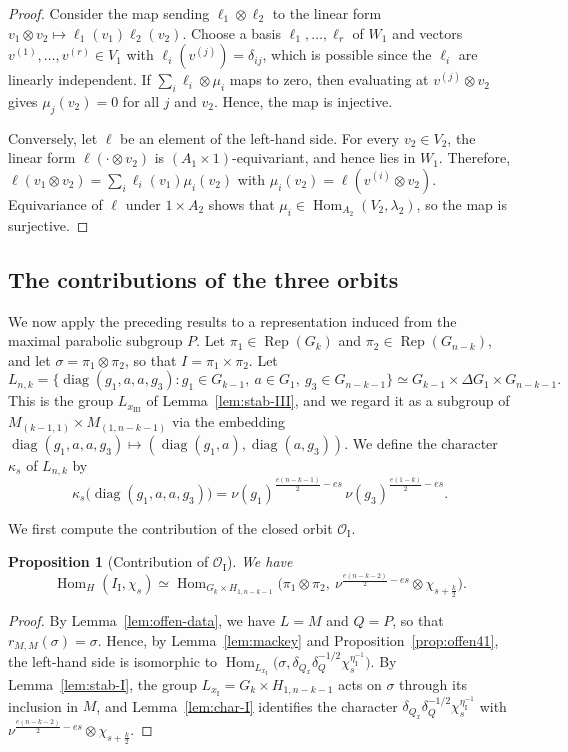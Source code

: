\documentclass[11pt]{amsart}
\numberwithin{equation}{section}
\theoremstyle{plain}
\newtheorem{proposition}[theorem]{Proposition}
\theoremstyle{definition}
\theoremstyle{remark}
\DeclareMathOperator{\Hom}{Hom}
\DeclareMathOperator{\Rep}{Rep}
\DeclareMathOperator{\diag}{diag}
\newcommand{\OI}{\mathcal{O}_{\mathrm{I}}}
\begin{document}
\begin{proof}
	Consider the map sending $\ell_1\otimes\ell_2$ to the linear form $v_1\otimes v_2\mapsto\ell_1(v_1)\ell_2(v_2)$. Choose a basis $\ell_1,\dots,\ell_r$ of $W_1$ and vectors $v^{(1)},\dots,v^{(r)}\in V_1$ with $\ell_i(v^{(j)})=\delta_{ij}$, which is possible since the $\ell_i$ are linearly independent. If $\sum_i\ell_i\otimes\mu_i$ maps to zero, then evaluating at $v^{(j)}\otimes v_2$ gives $\mu_j(v_2)=0$ for all $j$ and $v_2$. Hence, the map is injective.
	
	Conversely, let $\ell$ be an element of the left-hand side. For every $v_2\in V_2$, the linear form $\ell(\cdot\otimes v_2)$ is $(A_1\times1)$-equivariant, and hence lies in $W_1$. Therefore, $\ell(v_1\otimes v_2)=\sum_i\ell_i(v_1)\mu_i(v_2)$ with $\mu_i(v_2)=\ell(v^{(i)}\otimes v_2)$. Equivariance of $\ell$ under $1\times A_2$ shows that $\mu_i\in\Hom_{A_2}(V_2,\lambda_2)$, so the map is surjective.
\end{proof}

\subsection{The contributions of the three orbits}\label{ss:contributions}

We now apply the preceding results to a representation induced from the maximal parabolic subgroup $P$. Let $\pi_1\in\Rep(G_k)$ and $\pi_2\in\Rep(G_{n-k})$, and let $\sigma=\pi_1\otimes\pi_2$, so that $I=\pi_1\times\pi_2$. Let
$$
L_{n,k}=\{\diag(g_1,a,a,g_3):g_1\in G_{k-1},\ a\in G_1,\ g_3\in G_{n-k-1}\}\simeq G_{k-1}\times\Delta G_1\times G_{n-k-1}.
$$
This is the group $L_{x_{\mathrm{III}}}$ of Lemma~\ref{lem:stab-III}, and we regard it as a subgroup of $M_{(k-1,1)}\times M_{(1,n-k-1)}$ via the embedding $\diag(g_1,a,a,g_3)\mapsto(\diag(g_1,a),\diag(a,g_3))$. We define the character $\kappa_s$ of $L_{n,k}$ by
$$
\kappa_s\big(\diag(g_1,a,a,g_3)\big)=\nu(g_1)^{\frac{e(n-k-1)}2-es}\,\nu(g_3)^{\frac{e(1-k)}2-es}.
$$

We first compute the contribution of the closed orbit $\OI$.

\begin{proposition}[Contribution of $\OI$]\label{prop:contrib-I}
	We have
	$$
	\Hom_H(I_{\mathrm I},\chi_s)\simeq\Hom_{G_k\times H_{1,n-k-1}}\Big(\pi_1\otimes\pi_2,\ \nu^{\frac{e(n-k-2)}2-es}\otimes\chi_{s+\frac k2}\Big).
	$$
\end{proposition}

\begin{proof}
	By Lemma~\ref{lem:offen-data}, we have $L=M$ and $Q=P$, so that $r_{M,M}(\sigma)=\sigma$. Hence, by Lemma~\ref{lem:mackey} and Proposition~\ref{prop:offen41}, the left-hand side is isomorphic to $\Hom_{L_{x_{\mathrm I}}}\big(\sigma,\delta_{Q_x}\delta_Q^{-1/2}\chi_s^{\eta_{\mathrm I}^{-1}}\big)$. By Lemma~\ref{lem:stab-I}, the group $L_{x_{\mathrm I}}=G_k\times H_{1,n-k-1}$ acts on $\sigma$ through its inclusion in $M$, and Lemma~\ref{lem:char-I} identifies the character $\delta_{Q_x}\delta_Q^{-1/2}\chi_s^{\eta_{\mathrm I}^{-1}}$ with $\nu^{\frac{e(n-k-2)}2-es}\otimes\chi_{s+\frac k2}$.
\end{proof}
\end{document}
